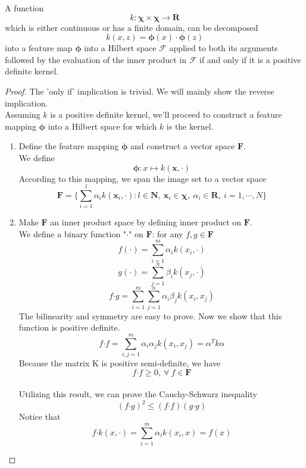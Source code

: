 \begin{theorem}
  A function $$k:\bm\chi\times\bm\chi\rightarrow\mathbf{R}$$ which is either continuous or has a finite domain, can be decomposed $$k(x,z)=\bm\phi(x)\cdot\bm\phi(z)$$
  into a feature map $\bm\phi$ into a Hilbert space $\mathscr{F}$ applied to both its arguments followed by the evaluation of the inner product in $\mathscr{F}$ if and only if it is a positive definite kernel.
\end{theorem}

\begin{proof}
 The 'only if' implication is trivial. We will mainly show the reverse implication.\\
 Assuming $k$ is a positive definite kernel, we'll proceed to construct a feature mapping $\bm\phi$ into a Hilbert space for which $k$ is the kernel.
 \begin{enumerate}
   \item Define the feature mapping $\bm\phi$ and construct a vector space $\bm F$.\\
      We define
      $$\bm\phi:x\longmapsto k(\bm x,\cdot)$$
      According to this mapping, we span the image set to a vector space
      $$\bm{F}=\{\sum_{i=1}^{l}\alpha_{i}k(\bm x_{i},\cdot):l\in\mathbf{N},\ \bm x_{i}\in\bm\chi,\ \alpha_{i}\in\mathbf{R},\ i=1,\cdots,N \}$$
   \item Make $\bm{F}$ an inner product space by defining inner product on $\bm F$.\\
      We define a binary function "$\bm{\cdot}$" on $\bm{F}$: for any $f,g\in \bm F$
      $$ f(\cdot)=\sum_{i=1}^{m}\alpha_{i}k(x_{i},\cdot) $$
      $$ g(\cdot)=\sum_{j=1}^{n}\beta_{i}k(x_{j},\cdot) $$
      $$ f\bm{\cdot} g=\sum_{i=1}^{m}\sum_{j=1}^{n}\alpha_{i}\beta_{j}k(x_{i},x_{j}) $$
      The bilinearity and symmetry are easy to prove. Now we show that this function is positive definite.
      $$ f\bm\cdot f=\sum_{i,j=1}^{m}\alpha_{i}\alpha_{j}k(x_{i},x_{j})=\alpha^T k\alpha $$
      Because the matrix K is positive semi-definite, we have $$f\bm\cdot f\geqslant 0,\ \forall\ f\in \bm{F}$$\\
      Utilizing this result, we can prove the Cauchy-Schwarz inequality
      \begin{equation}
        (f\bm\cdot g)^2\leqslant(f\bm\cdot f)(g\bm\cdot g)
      \end{equation}
      Notice that
      \begin{equation}
        f\bm\cdot k(x,\cdot)=\sum_{i=1}^{m}\alpha_{i}k(x_{i},x)=f(x)
      \end{equation}

\end{enumerate}
\end{proof}
